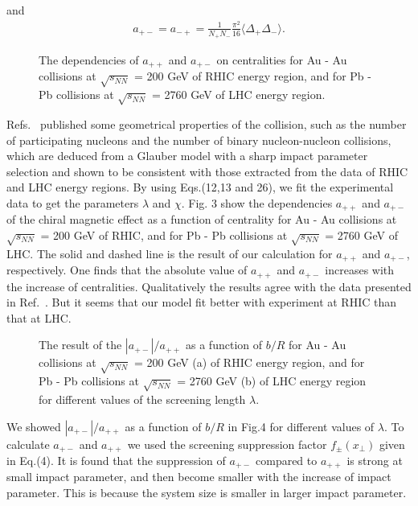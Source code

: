 \documentclass[twocolumn,showpacs,preprintnumbers,amsmath,amssymb]{revtex4}
\begin{document}
\noindent and
\begin{eqnarray}
a_{+-}=a_{-+}=\frac{1}{N_{+}N_{-}} \frac{\pi^2}{16} \langle\Delta_{+}\Delta_{-}\rangle.
\label{eq:eq29} %
\end{eqnarray}


\begin{figure}[h!]
\centering {}
\caption{The dependencies of $a_{++}$ and $a_{+-}$ on centralities for Au - Au collisions at $\sqrt{s_{NN}}$ = 200 GeV
of RHIC energy region, and for Pb - Pb collisions at $\sqrt{s_{NN}}$ = 2760 GeV of LHC energy region.}
\label{fig3} %
\end{figure}

Refs.~\cite{lab30,lab31} published some geometrical properties of the collision, such as the number of participating nucleons and the number of binary nucleon-nucleon collisions, which are deduced from a Glauber model with a sharp impact parameter selection and shown to be consistent with those extracted from the data of RHIC and LHC energy regions.
By using Eqs.(12,13 and 26), we fit the experimental data to get the parameters $\lambda$ and $\chi$.  Fig. 3 show the dependencies $a_{++}$ and $a_{+-}$ of the chiral magnetic effect as a function of centrality for Au - Au collisions at $\sqrt{s_{NN}}$ = 200 GeV of RHIC, and for Pb - Pb collisions at $\sqrt{s_{NN}}$ = 2760 GeV of LHC. The solid and dashed line is the result of our calculation for $a_{++}$ and $a_{+-}$, respectively. One finds that the absolute value of $a_{++}$ and $a_{+-}$ increases with the increase of centralities. Qualitatively the results agree with the data presented in Ref.~\cite{lab8,lab9,lab10,lab11}. But it seems that our model fit better with experiment at RHIC than that at LHC.

\begin{figure}[h!]
\centering {}
\caption{The result of the $|a_{+-}|/a_{++}$ as a function of $b/R$ for Au - Au collisions at $\sqrt{s_{NN}}$ = 200 GeV (a) of RHIC energy region, and for Pb - Pb collisions at $\sqrt{s_{NN}}$ = 2760 GeV (b) of LHC energy region for different values of the screening length $\lambda$.}
\label{fig4} %
\end{figure}

We showed $|a_{+-}|/a_{++}$ as a function of $b/R$ in Fig.4 for different values of $\lambda$. To calculate $a_{+-}$ and $a_{++}$ we used the screening suppression factor $f_{\pm}(x_\perp)$ given in Eq.(4). It is found that the suppression of $a_{+-}$ compared to $a_{++}$ is strong at small impact parameter, and then become smaller with the increase of impact parameter. This is because the system size is smaller in larger impact parameter.
\end{document}
